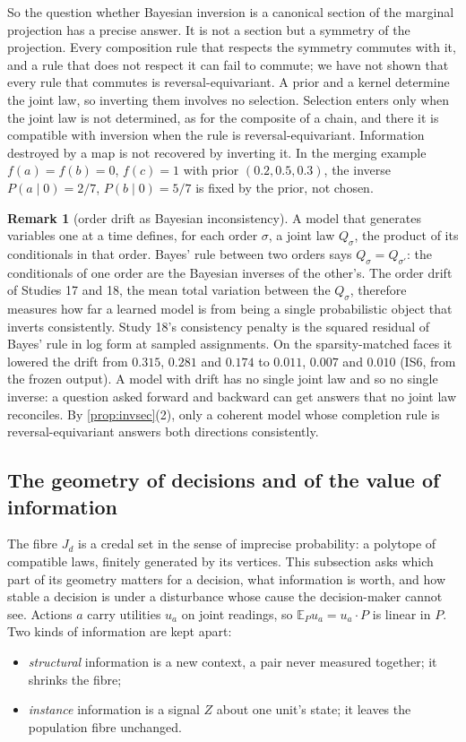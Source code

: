 \documentclass[11pt]{article}
\theoremstyle{definition}\newtheorem{definition}[theorem]{Definition}\newtheorem{remark}[theorem]{Remark}\newtheorem{example}[theorem]{Example}\newtheorem{problem}[theorem]{Open problem}\crefname{problem}{Problem}{Problems}
\begin{document}
So the question whether Bayesian inversion is a canonical section of the marginal projection has a precise answer. It is not a section but a symmetry of the projection. Every composition rule that respects the symmetry commutes with it, and a rule that does not respect it can fail to commute; we have not shown that every rule that commutes is reversal-equivariant. A prior and a kernel determine the joint law, so inverting them involves no selection. Selection enters only when the joint law is not determined, as for the composite of a chain, and there it is compatible with inversion when the rule is reversal-equivariant. Information destroyed by a map is not recovered by inverting it. In the merging example $f(a)=f(b)=0$, $f(c)=1$ with prior $(0.2,0.5,0.3)$, the inverse $P(a\mid0)=2/7$, $P(b\mid0)=5/7$ is fixed by the prior, not chosen.

\begin{remark}[order drift as Bayesian inconsistency]\label{rem:orderbayes}
A model that generates variables one at a time defines, for each order $\sigma$, a joint law $Q_\sigma$, the product of its conditionals in that order. Bayes' rule between two orders says $Q_\sigma=Q_{\sigma'}$: the conditionals of one order are the Bayesian inverses of the other's. The order drift of Studies 17 and 18, the mean total variation between the $Q_\sigma$, therefore measures how far a learned model is from being a single probabilistic object that inverts consistently. Study 18's consistency penalty is the squared residual of Bayes' rule in log form at sampled assignments. On the sparsity-matched faces it lowered the drift from $0.315$, $0.281$ and $0.174$ to $0.011$, $0.007$ and $0.010$ (IS6, from the frozen output). A model with drift has no single joint law and so no single inverse: a question asked forward and backward can get answers that no joint law reconciles. By \cref{prop:invsec}(2), only a coherent model whose completion rule is reversal-equivariant answers both directions consistently.
\end{remark}

\subsection{The geometry of decisions and of the value of information}\label{sec:voi}
The fibre $J_d$ is a credal set in the sense of imprecise probability: a polytope of compatible laws, finitely generated by its vertices. This subsection asks which part of its geometry matters for a decision, what information is worth, and how stable a decision is under a disturbance whose cause the decision-maker cannot see. Actions $a$ carry utilities $u_a$ on joint readings, so $\mathbb E_Pu_a=u_a\cdot P$ is linear in $P$. Two kinds of information are kept apart:
\begin{itemize}
\item \emph{structural} information is a new context, a pair never measured together; it shrinks the fibre;
\item \emph{instance} information is a signal $Z$ about one unit's state; it leaves the population fibre unchanged.
\end{itemize}
\end{document}
